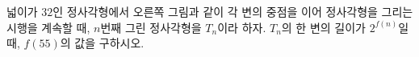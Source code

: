 \noindent\begin{minipage}[t]{0.58\linewidth}\vspace{0pt}\raggedright 넓이가 $32$인 정사각형에서 오른쪽 그림과 같이 각 변의 중점을 이어 정사각형을 그리는 시행을 계속할 때, $n$번째 그린 정사각형을 $T_n$이라 하자. $T_n$의 한 변의 길이가 $2^{f(n)}$일 때, $f(55)$의 값을 구하시오.\end{minipage}\hfill\begin{minipage}[t]{0.4\linewidth}\vspace{0pt}\centering \resizebox{\ifdim\width>\linewidth\linewidth\else\width\fi}{!}{}\end{minipage}\par
